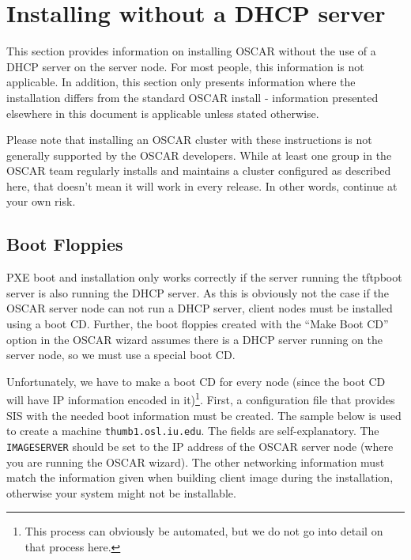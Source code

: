 %
% 
%
%
%

\section{Installing without a DHCP server}
\label{app:no_dhcp}

This section provides information on installing OSCAR without the use
of a DHCP server on the server node.  For most people, this
information is not applicable.  In addition, this section only
presents information where the installation differs from the standard
OSCAR install - information presented elsewhere in this document is
applicable unless stated otherwise.

Please note that installing an OSCAR cluster with these instructions
is not generally supported by the OSCAR developers.  While at least
one group in the OSCAR team regularly installs and maintains a
cluster configured as described here, that doesn't mean it will work
in every release.  In other words, continue at your own risk.

\subsection{Boot Floppies}

PXE boot and installation only works correctly if the server running
the tftpboot server is also running the DHCP server.  As this is
obviously not the case if the OSCAR server node can not run a DHCP
server, client nodes must be installed using a boot CD.  Further,
the boot floppies created with the ``Make Boot CD'' option in the
OSCAR wizard assumes there is a DHCP server running on the server
node, so we must use a special boot CD.

Unfortunately, we have to make a boot CD for every node (since the
boot CD will have IP information encoded in it)\footnote{This
  process can obviously be automated, but we do not go into detail on
  that process here.}.  First, a configuration file that provides SIS
with the needed boot information must be created.  The sample below is
used to create a machine {\tt thumb1.osl.iu.edu}.  The fields are
self-explanatory.  The {\tt IMAGESERVER} should be set to the IP
address of the OSCAR server node (where you are running the OSCAR
wizard).  The other networking information must match the information
given when building client image during the installation, otherwise
your system might not be installable.

